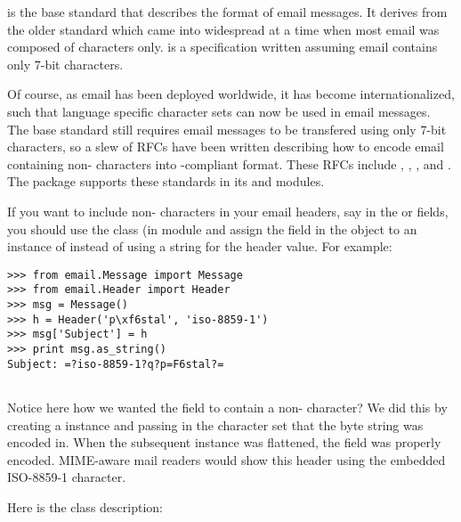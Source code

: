 
 is the base standard that describes the format of email
messages.  It derives from the older  standard which came
into widespread at a time when most email was composed of \ASCII{}
characters only.   is a specification written assuming email
contains only 7-bit \ASCII{} characters.

Of course, as email has been deployed worldwide, it has become
internationalized, such that language specific character sets can now
be used in email messages.  The base standard still requires email
messages to be transfered using only 7-bit \ASCII{} characters, so a
slew of RFCs have been written describing how to encode email
containing non-\ASCII{} characters into -compliant format.
These RFCs include , , , and .
The  package supports these standards in its
 and  modules.

If you want to include non-\ASCII{} characters in your email headers,
say in the  or  fields, you should
use the  class (in module  and
assign the field in the  object to an instance of
 instead of using a string for the header value.  For
example:

\begin{verbatim}
>>> from email.Message import Message
>>> from email.Header import Header
>>> msg = Message()
>>> h = Header('p\xf6stal', 'iso-8859-1')
>>> msg['Subject'] = h
>>> print msg.as_string()
Subject: =?iso-8859-1?q?p=F6stal?=


\end{verbatim}

Notice here how we wanted the  field to contain a
non-\ASCII{} character?  We did this by creating a 
instance and passing in the character set that the byte string was
encoded in.  When the subsequent  instance was
flattened, the  field was properly 
encoded.  MIME-aware mail readers would show this header using the
embedded ISO-8859-1 character.


Here is the  class description:

